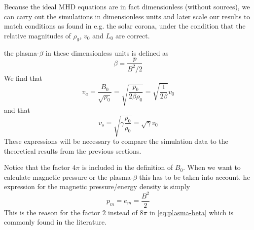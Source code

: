 Because the ideal MHD equations are in fact dimensionless (without sources), we can carry out the simulations in dimensionless units and later scale our results to match conditions as found in e.g. the solar corona, under the condition that the relative magnitudes of $\rho_0$, $v_0$ and $L_0$ are correct.

the plasma-$\beta$ in these dimensionless units is defined as
\begin{equation}
	\beta = \frac{p}{B^2/2}
	\label{eq:plasma-beta}
\end{equation}
We find that
\begin{equation}
	v_a = \frac{B_0}{\sqrt{\rho_0}} = \sqrt{ \frac{p_0}{2\beta\rho_0}} = \sqrt{ \frac{1}{2\beta}}v_0
	\label{eq:Alfven-code-units}
\end{equation}
and that
\begin{equation}
	v_s = \sqrt{ \gamma\frac{p_0}{\rho_0}} = \sqrt{\gamma}v_0
	\label{eq:sound-code-units}
\end{equation}
These expressions will be necessary to compare the simulation data to the theoretical results from the previous sections.

Notice that the factor $4\pi$ is included in the definition of $B_0$. When we want to calculate magnetic pressure or the plasma-$\beta$ this has to be taken into account.
he expression for the magnetic pressure/energy density is simply
\begin{equation}
	p_m = e_m = \frac{B^2}{2}
	\label{eq:magnetic-pressure}
\end{equation}
This is the reason for the factor $2$ instead of $8\pi$ in \cref{eq:plasma-beta} which is commonly found in the literature.

